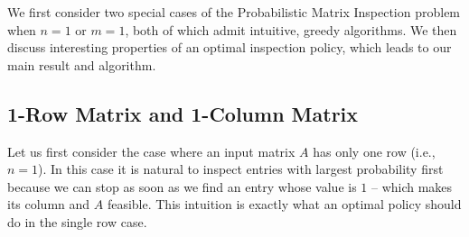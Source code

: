 We first consider two special cases of the Probabilistic Matrix Inspection problem when $n=1$ or $m=1$, both of which admit intuitive, greedy algorithms. We then discuss interesting properties of an optimal inspection policy, which leads to our main result and algorithm.

 \subsection{1-Row Matrix and 1-Column Matrix}
 Let us first consider the case where an input matrix $A$ has only one row (i.e., $n = 1$).
 In this case it is natural to inspect entries with largest probability first because we can stop as soon as we find an entry whose value is $1$ -- which makes its column and $A$ feasible. This intuition is exactly what an optimal policy should do in the single row case.

